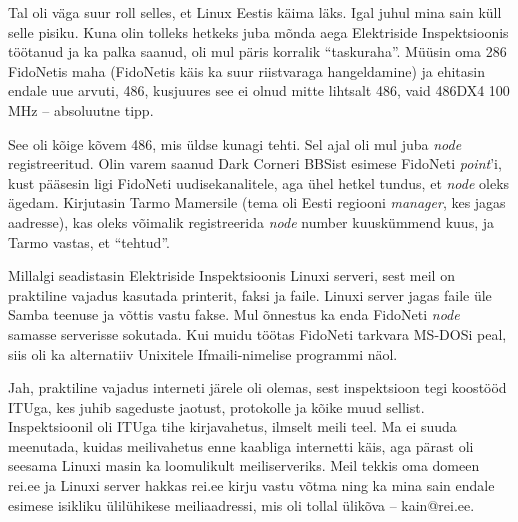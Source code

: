 
Tal oli väga suur roll selles, et Linux 
Eestis käima läks. Igal juhul mina sain küll selle pisiku. Kuna olin tolleks 
hetkeks juba mõnda aega Elektriside Inspektsioonis töötanud ja ka palka saanud, oli mul päris korralik 
\enquote{taskuraha}. Müüsin oma 286 FidoNetis maha 
(FidoNetis käis ka suur riistvaraga hangeldamine) ja ehitasin endale uue arvuti,
486, kusjuures see ei olnud mitte lihtsalt 486, vaid 486DX4 
100 MHz -- absoluutne tipp. 

See oli kõige kõvem 486, mis üldse kunagi tehti. Sel ajal oli mul juba \emph{node} registreeritud. Olin varem saanud Dark Corneri 
BBSist esimese FidoNeti \emph{point}'i, kust 
pääsesin ligi FidoNeti uudisekanalitele, aga ühel hetkel tundus, et 
\emph{node} oleks ägedam. Kirjutasin Tarmo Mamersile (tema oli Eesti regiooni \emph{manager}, kes jagas aadresse), 
kas oleks võimalik registreerida \emph{node} number kuuskümmend kuus, ja 
Tarmo vastas, et \enquote{tehtud}.

Millalgi seadistasin Elektriside Inspektsioonis 
Linuxi serveri, sest meil on praktiline vajadus kasutada
printerit, faksi ja faile. Linuxi server jagas 
faile üle Samba teenuse ja võttis vastu fakse. Mul õnnestus ka enda 
FidoNeti \emph{node} samasse serverisse sokutada. Kui muidu töötas FidoNeti 
tarkvara MS-DOSi peal, siis oli ka alternatiiv Unixitele 
Ifmaili-nimelise programmi näol.


Jah, praktiline vajadus interneti järele oli olemas, sest 
inspektsioon tegi koostööd 
ITUga, kes 
juhib sageduste jaotust, protokolle ja kõike muud sellist. 
Inspektsioonil oli ITUga tihe kirjavahetus, ilmselt meili teel. Ma 
ei suuda meenutada, kuidas meilivahetus enne kaabliga internetti käis, aga 
pärast oli seesama Linuxi masin ka loomulikult meiliserveriks. Meil
tekkis oma domeen rei.ee ja Linuxi server hakkas rei.ee kirju vastu 
võtma ning ka mina sain endale esimese isikliku ülilühikese meiliaadressi, mis 
oli tollal ülikõva -- kain@rei.ee.

